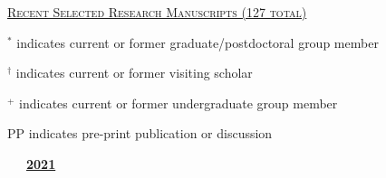 \documentclass[10pt]{report}
\begin{document}
\vspace*{.1in}
\textsc{\underline{Recent Selected Research Manuscripts (127 total)}}
%

{ \small $^{*}$ indicates current or former graduate/postdoctoral group member}

{ \small $^{\dagger}$ indicates current or former visiting scholar}

{ \small $^{+}$ indicates current or former undergraduate group member}


{ PP indicates pre-print publication or discussion}

\vspace*{.1in}

\mbox{\ \ \ \underline{\textbf{2021}}}
\end{document}
